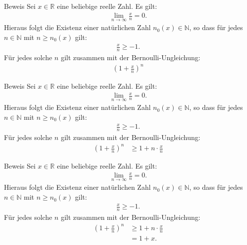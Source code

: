 \documentclass[10pt]{beamer}
\def\bN{\mathbb{N}}
\def\bR{\mathbb{R}}
\begin{document}
\begin{frame}{Beweis}
    Sei \( x \in \bR \) eine beliebige reelle Zahl. Es gilt:
    \begin{align*}
        \lim_{n \to \infty} \frac{x}{n} = 0. 
    \end{align*}
    Hieraus folgt die Existenz einer natürlichen Zahl \( n_{0}(x) \in \bN \), so dass für jedes \( n \in \bN \) mit \( n \geq n_{0}(x) \) gilt:
    \begin{align*}
        \frac{x}{n} 
        \geq - 1.
    \end{align*}
    Für jedes solche \( n \) gilt zusammen mit der Bernoulli-Ungleichung:
    \begin{align*}
        \left( 1 + \frac{x}{n} \right)^{n}
    \end{align*}
\end{frame}



\begin{frame}{Beweis}
    Sei \( x \in \bR \) eine beliebige reelle Zahl. Es gilt:
    \begin{align*}
        \lim_{n \to \infty} \frac{x}{n} = 0. 
    \end{align*}
    Hieraus folgt die Existenz einer natürlichen Zahl \( n_{0}(x) \in \bN \), so dass für jedes \( n \in \bN \) mit \( n \geq n_{0}(x) \) gilt:
    \begin{align*}
        \frac{x}{n} 
        \geq - 1.
    \end{align*}
    Für jedes solche \( n \) gilt zusammen mit der Bernoulli-Ungleichung:
    \begin{align*}
        \left( 1 + \frac{x}{n} \right)^{n}
        & \geq 1 + n \cdot \frac{x}{n}
    \end{align*}
\end{frame}



\begin{frame}{Beweis}
    Sei \( x \in \bR \) eine beliebige reelle Zahl. Es gilt:
    \begin{align*}
        \lim_{n \to \infty} \frac{x}{n} = 0. 
    \end{align*}
    Hieraus folgt die Existenz einer natürlichen Zahl \( n_{0}(x) \in \bN \), so dass für jedes \( n \in \bN \) mit \( n \geq n_{0}(x) \) gilt:
    \begin{align*}
        \frac{x}{n} 
        \geq - 1.
    \end{align*}
    Für jedes solche \( n \) gilt zusammen mit der Bernoulli-Ungleichung:
    \begin{align*}
        \left( 1 + \frac{x}{n} \right)^{n}
        & \geq 1 + n \cdot \frac{x}{n} \\
        & = 1 + x.
    \end{align*}
\end{frame}
\end{document}
